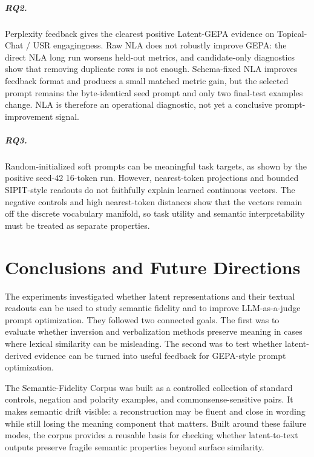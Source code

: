 \documentclass[12pt,a4paper,twoside,openright]{book}
\begin{document}
\paragraph{RQ2.}
Perplexity feedback gives the clearest positive Latent-GEPA evidence on
Topical-Chat / USR engagingness. Raw NLA does not robustly improve GEPA: the
direct NLA long run worsens held-out metrics, and candidate-only diagnostics
show that removing duplicate rows is not enough. Schema-fixed NLA improves
feedback format and produces a small matched metric gain, but the selected
prompt remains the byte-identical seed prompt and only two final-test examples
change. NLA is therefore an operational diagnostic, not yet a conclusive
prompt-improvement signal.

\paragraph{RQ3.}
Random-initialized soft prompts can be meaningful task targets, as shown by the
positive seed-42 16-token run. However, nearest-token projections and bounded
SIPIT-style readouts do not faithfully explain learned continuous vectors. The
negative controls and high nearest-token distances show that the vectors remain
off the discrete vocabulary manifold, so task utility and semantic
interpretability must be treated as separate properties.

\chapter{Conclusions and Future Directions}
\label{chapter:conclusions}

The experiments investigated whether latent representations and their textual
readouts can be used to study semantic fidelity and to improve LLM-as-a-judge
prompt optimization. They followed two connected goals. The first was to
evaluate whether inversion and verbalization methods preserve meaning in cases
where lexical similarity can be misleading. The second was to test whether
latent-derived evidence can be turned into useful feedback for GEPA-style
prompt optimization.

The Semantic-Fidelity Corpus was built as a controlled collection of standard
controls, negation and polarity examples, and commonsense-sensitive pairs. It
makes semantic drift visible: a reconstruction may be fluent and close in
wording while still losing the meaning component that matters. Built around
these failure modes, the corpus provides a reusable basis for checking whether
latent-to-text outputs preserve fragile semantic properties beyond surface
similarity.
\end{document}
